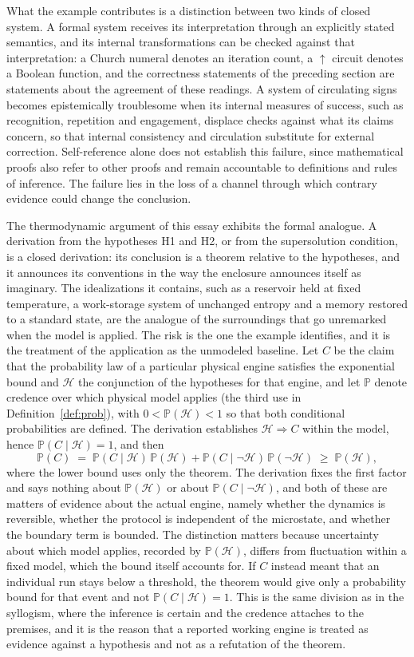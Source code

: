 \documentclass[11pt]{article}
\theoremstyle{definition}
\theoremstyle{remark}
\renewcommand{\Pr}{\mathbb{P}}
\newcommand{\nand}{\uparrow}
\begin{document}
What the example contributes is a distinction between two kinds of closed system. A formal system receives its interpretation through an explicitly stated semantics, and its internal transformations can be checked against that interpretation: a Church numeral denotes an iteration count, a $\nand$ circuit denotes a Boolean function, and the correctness statements of the preceding section are statements about the agreement of these readings. A system of circulating signs becomes epistemically troublesome when its internal measures of success, such as recognition, repetition and engagement, displace checks against what its claims concern, so that internal consistency and circulation substitute for external correction. Self-reference alone does not establish this failure, since mathematical proofs also refer to other proofs and remain accountable to definitions and rules of inference. The failure lies in the loss of a channel through which contrary evidence could change the conclusion.

The thermodynamic argument of this essay exhibits the formal analogue. A derivation from the hypotheses H1 and H2, or from the supersolution condition, is a closed derivation: its conclusion is a theorem relative to the hypotheses, and it announces its conventions in the way the enclosure announces itself as imaginary. The idealizations it contains, such as a reservoir held at fixed temperature, a work-storage system of unchanged entropy and a memory restored to a standard state, are the analogue of the surroundings that go unremarked when the model is applied. The risk is the one the example identifies, and it is the treatment of the application as the unmodeled baseline. Let $C$ be the claim that the probability law of a particular physical engine satisfies the exponential bound and $\mathcal{H}$ the conjunction of the hypotheses for that engine, and let $\Pr$ denote credence over which physical model applies (the third use in Definition~\ref{def:prob}), with $0 < \Pr(\mathcal{H}) < 1$ so that both conditional probabilities are defined. The derivation establishes $\mathcal{H} \Rightarrow C$ within the model, hence $\Pr(C \mid \mathcal{H}) = 1$, and then
\[
\Pr(C) \;=\; \Pr(C \mid \mathcal{H})\,\Pr(\mathcal{H}) + \Pr(C \mid \neg \mathcal{H})\,\Pr(\neg \mathcal{H}) \;\ge\; \Pr(\mathcal{H}),
\]
where the lower bound uses only the theorem. The derivation fixes the first factor and says nothing about $\Pr(\mathcal{H})$ or about $\Pr(C \mid \neg \mathcal{H})$, and both of these are matters of evidence about the actual engine, namely whether the dynamics is reversible, whether the protocol is independent of the microstate, and whether the boundary term is bounded. The distinction matters because uncertainty about which model applies, recorded by $\Pr(\mathcal{H})$, differs from fluctuation within a fixed model, which the bound itself accounts for. If $C$ instead meant that an individual run stays below a threshold, the theorem would give only a probability bound for that event and not $\Pr(C \mid \mathcal{H}) = 1$. This is the same division as in the syllogism, where the inference is certain and the credence attaches to the premises, and it is the reason that a reported working engine is treated as evidence against a hypothesis and not as a refutation of the theorem.
\end{document}
